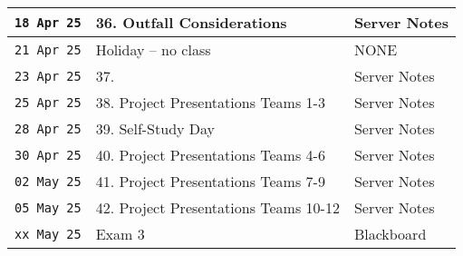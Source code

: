\documentclass[12pt]{article}
\begin{document}
\begin{center}
\begin{table}[ht!]
\begin{tabular}{| p{0.8in} | p{3.5in} | p{2.0in} |}
\texttt{18 Apr 25} & 36. Outfall Considerations  & Server Notes \\
\hline
\texttt{21 Apr 25} & Holiday -- no class & NONE \\
\texttt{23 Apr 25} & 37.  & Server Notes \\
\texttt{25 Apr 25} & 38. Project Presentations Teams 1-3 & Server Notes  \\
\hline
\texttt{28 Apr 25} & 39. Self-Study Day & Server Notes   \\
\texttt{30 Apr 25} & 40. Project Presentations Teams 4-6 & Server Notes   \\
\texttt{02 May 25} & 41. Project Presentations Teams 7-9 & Server Notes   \\
\hline
\texttt{05 May 25} & 42. Project Presentations Teams 10-12 & Server Notes   \\
\hline
\hline
\texttt{xx May 25} & Exam 3 & Blackboard \\
\hline
\hline
   \end{tabular}
   \label{tab:sp2025scheduleB}
\end{table}
\end{center}
\clearpage
\end{document}
